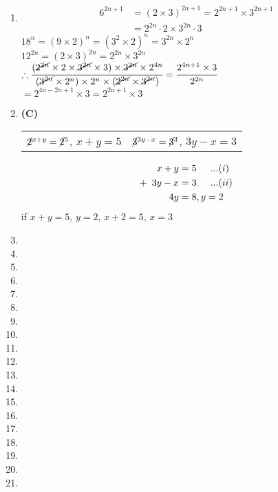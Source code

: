 \begin{multicols}{2}
\begin{enumerate}[label={\arabic*.}]
    \item \begin{align*}6^{2n + 1} &= (2 \times 3)^{2n + 1} = 2^{2n+1}\times 3^{2n+1} \\
        & = 2^{2n}\cdot2 \times 3^{2n} \cdot 3
    \end{align*}
    $18^n = (9 \times 2)^n = (3^2 \times 2)^n = 3^{2n} \times 2^n$ \\
    $12^{2n} = (2 \times 3)^{2n} = 2^{2n} \times 3^{2n}$ \\

    $\therefore \cfrac{(\cancel{2^{2n}} \times 2 \times \cancel{3^{2n}} \times 3) \times \cancel{3^{2n}} \times 2^{4n}}{(\cancel{3^{2n}} \times 2^{n}) \times 2^{n} \times (\cancel{2^{2n}} \times \cancel{3^{2n}})}  = \cfrac{2^{4n + 1} \times 3}{2^{2n}}$\\
     $= 2^{4n - 2n + 1} \times 3  = 2^{2n + 1} \times 3$
    \item \textbf{(C)} \begin{tabular}{c|c}
        $\cancel{2}^{x+y} = \cancel{2}^5$, $x+y = 5$ & $\cancel{3}^{3y - x} = \cancel{3}^3$, $3y -x  = 3$
    \end{tabular}
    \begin{align*}
        x + y & = 5 \hspace{.2in} ...(i) \\
       +\hspace{5pt} 3y -x & = 3 \hspace{.2in} ...(ii) \\
       4y &= 8 , y= 2
    \end{align*}
    if $x+y = 5$, $y=2$, $x+2 = 5$, $x=3$
    \item 
    \item
    \item
    \item 
    \item 
    \item 
    \item 
    \item
    \item
    \item
    \item 
    \item
    \item
    \item 
    \item 
    \item 
    \item 
    \item
    \item

\end{enumerate}
\end{multicols}
